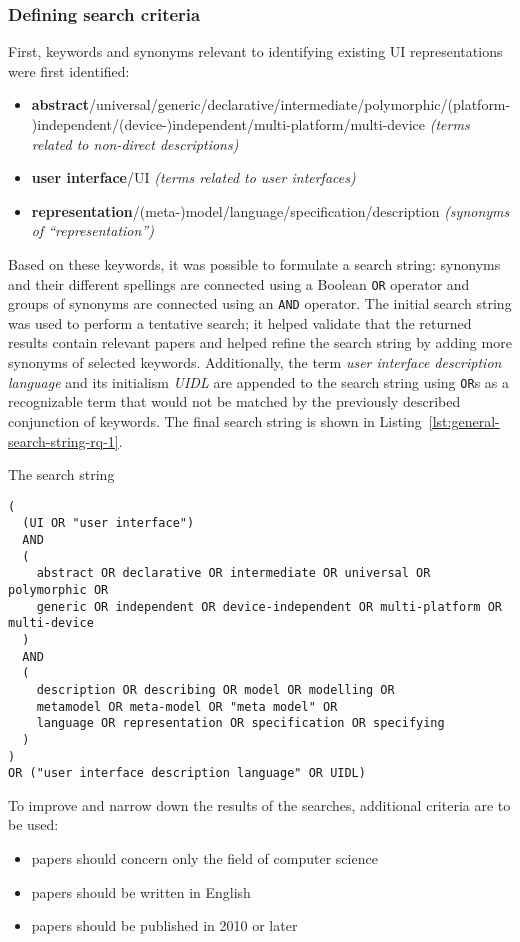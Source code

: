 \subsubsection{Defining search criteria}
First, keywords and synonyms relevant to identifying existing UI representations were first identified:
\begin{itemize}
    \item \textbf{abstract}/universal/generic/declarative/intermediate/polymorphic/(platform-)independent/(device-)independent/multi-platform/multi-device\,\textendash\,\textit{(terms related to non-direct descriptions)}
    \item \textbf{user interface}/UI\,\textendash\,\textit{(terms related to user interfaces)}
    \item \textbf{representation}/(meta-)model/language/specification/description\,\textendash\,\textit{(synonyms of \enquote{representation})}
\end{itemize}
Based on these keywords, it was possible to formulate a search string: synonyms and their different spellings are connected using a Boolean \texttt{OR} operator and groups of synonyms are connected using an \texttt{AND} operator.
The initial search string was used to perform a tentative search;
it helped validate that the returned results contain relevant papers and helped refine the search string by adding more synonyms of selected keywords.
Additionally, the term \emph{user interface description language} and its initialism \emph{UIDL} are appended to the search string using \texttt{OR}s as a recognizable term that would not be matched by the previously described conjunction of keywords.
The final search string is shown in Listing~\ref{lst:general-search-string-rq-1}.
\begin{listing}
    \caption{The search string}
    \begin{verbatim}
(
  (UI OR "user interface")
  AND
  (
    abstract OR declarative OR intermediate OR universal OR polymorphic OR
    generic OR independent OR device-independent OR multi-platform OR multi-device
  )
  AND
  (
    description OR describing OR model OR modelling OR
    metamodel OR meta-model OR "meta model" OR
    language OR representation OR specification OR specifying
  )
)
OR ("user interface description language" OR UIDL)
    \end{verbatim}
    \label{lst:general-search-string-rq-1}
\end{listing}

To improve and narrow down the results of the searches, additional criteria are to be used:
\begin{samepage}
\begin{itemize}
    \item papers should concern only the field of computer science
    \item papers should be written in English
    \item papers should be published in 2010 or later
\end{itemize}
\end{samepage}


